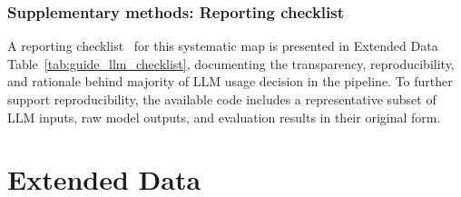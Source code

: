 \documentclass[12pt]{article}
\begin{document}
\newpage
\subsubsection*{Supplementary methods: Reporting checklist}
\label{smethods:llm_config}
A reporting checklist~\cite{feuerriegel_reporting_2026} for this systematic map is presented in Extended Data Table~\ref{tab:guide_llm_checklist}, documenting the transparency, reproducibility, and rationale behind majority of LLM usage decision in the pipeline. To further support reproducibility, the available code includes a representative subset of LLM inputs, raw model outputs, and evaluation results in their original form.



\newpage
\newpage
\section*{Extended Data}
\setcounter{table}{0}
\setcounter{figure}{0}
\renewcommand{\thetable}{\arabic{table}}
\renewcommand{\thefigure}{\arabic{figure}}
\renewcommand{\tablename}{Extended Data Table}
\renewcommand{\figurename}{Extended Data Fig.}


\newpage
\end{document}
